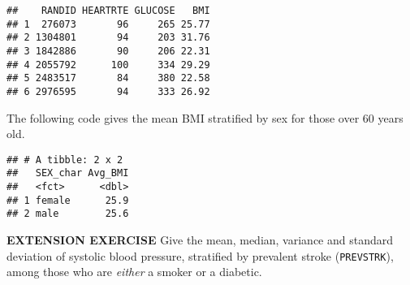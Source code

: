 \documentclass[
]{article}
\newenvironment{Shaded}{\begin{snugshade}}{\end{snugshade}}
\newcommand{\CommentTok}[1]{\textcolor[rgb]{0.56,0.35,0.01}{\textit{#1}}}
\newcommand{\DataTypeTok}[1]{\textcolor[rgb]{0.13,0.29,0.53}{#1}}
\newcommand{\DecValTok}[1]{\textcolor[rgb]{0.00,0.00,0.81}{#1}}
\newcommand{\KeywordTok}[1]{\textcolor[rgb]{0.13,0.29,0.53}{\textbf{#1}}}
\newcommand{\NormalTok}[1]{#1}
\newcommand{\OperatorTok}[1]{\textcolor[rgb]{0.81,0.36,0.00}{\textbf{#1}}}
\newcommand{\OtherTok}[1]{\textcolor[rgb]{0.56,0.35,0.01}{#1}}
\newcommand{\StringTok}[1]{\textcolor[rgb]{0.31,0.60,0.02}{#1}}
\begin{document}
\begin{Shaded}
\end{Shaded}

\begin{verbatim}
##    RANDID HEARTRTE GLUCOSE   BMI
## 1  276073       96     265 25.77
## 2 1304801       94     203 31.76
## 3 1842886       90     206 22.31
## 4 2055792      100     334 29.29
## 5 2483517       84     380 22.58
## 6 2976595       94     333 26.92
\end{verbatim}

The following code gives the mean BMI stratified by sex for those over
60 years old.

\begin{Shaded}
\end{Shaded}

\begin{verbatim}
## # A tibble: 2 x 2
##   SEX_char Avg_BMI
##   <fct>      <dbl>
## 1 female      25.9
## 2 male        25.6
\end{verbatim}

\textbf{EXTENSION EXERCISE} Give the mean, median, variance and standard
deviation of systolic blood pressure, stratified by prevalent stroke
(\texttt{PREVSTRK}), among those who are \emph{either} a smoker or a
diabetic.
\end{document}
